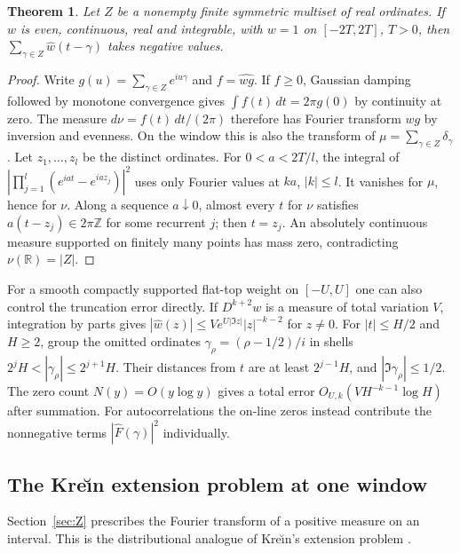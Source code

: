 \documentclass[10pt]{amsart}
\newtheorem{theorem}{Theorem}[section]
\theoremstyle{definition}
\theoremstyle{remark}
\begin{document}
\begin{theorem}\label{thm:finZ}
Let $Z$ be a nonempty finite symmetric multiset of real ordinates.
If $w$ is even, continuous, real and integrable, with $w=1$ on
$[-2T,2T]$, $T>0$, then $\sum_{\gamma\in Z}\widehat w(t-\gamma)$
takes negative values.
\end{theorem}
\begin{proof}
Write $g(u)=\sum_{\gamma\in Z}e^{iu\gamma}$ and $f=\widehat{wg}$.
If $f\ge0$, Gaussian damping followed by monotone convergence gives
$\int f(t)\,dt=2\pi g(0)$ by continuity at zero. The measure
$d\nu=f(t)\,dt/(2\pi)$ therefore has Fourier transform $wg$ by
inversion and evenness. On the window this is also the transform
of $\mu=\sum_{\gamma\in Z}\delta_\gamma$.
Let $z_1,\ldots,z_l$ be the distinct ordinates. For $0<a<2T/l$,
the integral of $|\prod_{j=1}^l(e^{iat}-e^{iaz_j})|^2$ uses only
Fourier values at $ka$, $|k|\le l$. It vanishes for $\mu$, hence
for $\nu$. Along a sequence $a\downarrow0$, almost every $t$ for
$\nu$ satisfies $a(t-z_j)\in2\pi\mathbb Z$ for some recurrent $j$;
then $t=z_j$. An absolutely continuous measure supported on finitely
many points has mass zero, contradicting $\nu(\mathbb R)=|Z|$.
\end{proof}

For a smooth compactly supported flat-top weight on $[-U,U]$ one
can also control the truncation error directly. If $D^{k+2}w$ is a
measure of total variation $V$, integration by parts gives
$|\widehat w(z)|\le Ve^{U|\Im z|}|z|^{-k-2}$ for $z\ne0$.
For $|t|\le H/2$ and $H\ge2$, group the omitted ordinates
$\gamma_\rho=(\rho-1/2)/i$ in shells
$2^jH<|\gamma_\rho|\le2^{j+1}H$. Their distances from $t$ are
at least $2^{j-1}H$, and $|\Im\gamma_\rho|\le1/2$.
The zero count $N(y)=O(y\log y)$ gives a total error
$O_{U,k}(VH^{-k-1}\log H)$ after summation. For autocorrelations
the on-line zeros instead contribute the nonnegative terms
$|\widehat F(\gamma)|^2$ individually.

\subsection{The Kre\u{\i}n extension problem at one window}\label{subsec:KEP}
Section~\ref{sec:Z} prescribes the Fourier transform of a positive measure on an interval.
This is the distributional analogue of Kre\u{\i}n's extension problem
\cite{Krein1940,Sasvari1994}.
\end{document}
